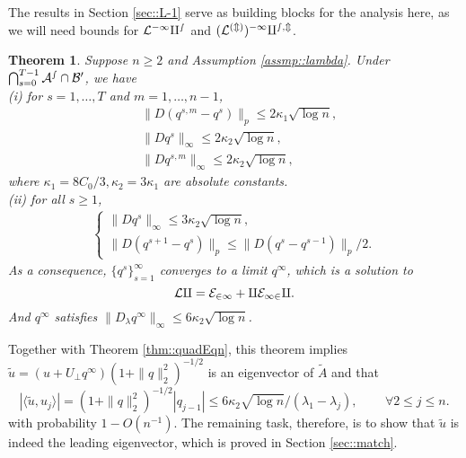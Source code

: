 \documentclass[12pt]{article}%
\theoremstyle{plain}%
\newtheorem{thm}{Theorem}[section]
\theoremstyle{remark}
\begin{document}

The results in Section \ref{sec::L-1} serve as building blocks for the analysis here, as we will need bounds for $\cal{L}^{-1} q^s$ and $(\cal{L}^{(m)})^{-1} q^{s,m}$.
\begin{thm}\label{thm::indctQs}
Suppose $n\ge 2$ and Assumption \ref{assmp::lambda}. Under $\bigcap_{s=0}^{T-1}\cal{A}^s \cap \cal{B}^0$, we have \\
(i) for $s=1,\ldots,T$ and $m = 1,\ldots,n-1$, 
\begin{align}
&\| D (q^{s,m} - q^s) \|_p \le 2\kappa_1 \sqrt{ \log n}, \label{ineqn::qDiff}\\
&\| D q^s \|_\infty \le 2\kappa_2\sqrt{ \log n}, \label{ineqn::qt}\\
&\| D q^{s,m} \|_\infty \le 2\kappa_2\sqrt{ \log n}, \label{ineqn::qtm}
\end{align}
where $\kappa_1 = 8C_0/3, \kappa_2 = 3\kappa_1$ are absolute constants.\\
(ii) for all $s \ge 1$,
\begin{align}
\begin{cases}
\| D q^s \|_\infty \le 3 \kappa_2 \sqrt{ \log n}, \\
\| D (q^{s+1} - q^s) \|_p \le \| D (q^s - q^{s-1}) \|_p / 2.
\end{cases}
\end{align}
As a consequence, $\{ q^s \}_{s=1}^\infty$ converges to a limit $q^\infty$, which is a solution to
\begin{equation*}
\cal{L} q = E_{21} + q E_{12} q.
\end{equation*}
And $q^\infty$ satisfies $\| D_\lambda q^\infty \|_\infty \le 6\kappa_2 \sqrt{\log n}$. 
\end{thm}

Together with Theorem \ref{thm::quadEqn}, this theorem implies $\tilde{u} = (u+U_\bot q^\infty)( 1 + \| q \|_2^2)^{-1/2}$ is an eigenvector of $\tilde{A}$ and that 
\begin{equation*}
| \langle \tilde{u}, u_j \rangle | = ( 1 + \| q \|_2^2)^{-1/2}|q_{j-1}|  \le 6\kappa_2\sqrt{\log n}/(\lambda_1 - \lambda_j), \qquad \, \forall2 \le  j \le n.
\end{equation*}
with probability $1 - O(n^{-1})$. The remaining task, therefore, is to show that $\tilde{u}$ is indeed the leading eigenvector, which is proved in Section \ref{sec::match}.
\end{document}
